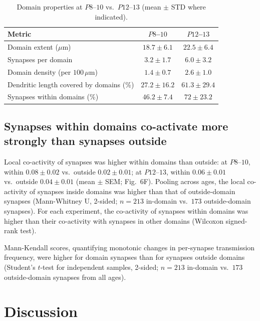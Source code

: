 \documentclass[11pt]{article}
\begin{document}
\begin{table}[h]
\centering
\caption{Domain properties at $P8$--$10$ vs.\ $P12$--$13$ (mean $\pm$ STD where indicated).}
\label{tab:domains}
\begin{tabular}{lcc}
\toprule
Metric & $P8$--$10$ & $P12$--$13$ \\
\midrule
Domain extent ($\mu$m) & $18.7 \pm 6.1$ & $22.5 \pm 6.4$ \\
Synapses per domain & $3.2 \pm 1.7$ & $6.0 \pm 3.2$ \\
Domain density (per $100\,\mu$m) & $1.4 \pm 0.7$ & $2.6 \pm 1.0$ \\
Dendritic length covered by domains (\%) & $27.2 \pm 16.2$ & $61.3 \pm 29.4$ \\
Synapses within domains (\%) & $46.2 \pm 7.4$ & $72 \pm 23.2$ \\
\bottomrule
\end{tabular}
\end{table}

\subsection{Synapses within domains co-activate more strongly than synapses outside}
Local co-activity of synapses was higher within domains than outside: at $P8$--$10$, within $0.08 \pm 0.02$ vs.\ outside $0.02 \pm 0.01$; at $P12$--$13$, within $0.06 \pm 0.01$ vs.\ outside $0.04 \pm 0.01$ (mean $\pm$ SEM; Fig.~6F). Pooling across ages, the local co-activity of synapses inside domains was higher than that of outside-domain synapses (Mann-Whitney U, 2-sided; $n = 213$ in-domain vs.\ $173$ outside-domain synapses). For each experiment, the co-activity of synapses within domains was higher than their co-activity with synapses in other domains (Wilcoxon signed-rank test).

Mann-Kendall scores, quantifying monotonic changes in per-synapse transmission frequency, were higher for domain synapses than for synapses outside domains (Student's $t$-test for independent samples, 2-sided; $n = 213$ in-domain vs.\ $173$ outside-domain synapses from all ages).

\section{Discussion}
\end{document}
